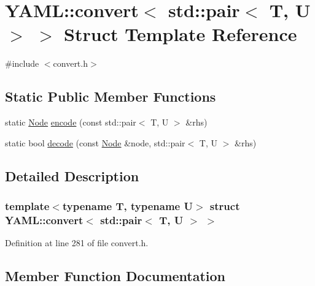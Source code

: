 \hypertarget{struct_y_a_m_l_1_1convert_3_01std_1_1pair_3_01_t_00_01_u_01_4_01_4}{}\section{Y\+A\+ML\+::convert$<$ std\+::pair$<$ T, U $>$ $>$ Struct Template Reference}
\label{struct_y_a_m_l_1_1convert_3_01std_1_1pair_3_01_t_00_01_u_01_4_01_4}


{\ttfamily \#include $<$convert.\+h$>$}

\subsection*{Static Public Member Functions}
\begin{DoxyCompactItemize}
\item 
static \mbox{\hyperlink{class_y_a_m_l_1_1_node}{Node}} \mbox{\hyperlink{struct_y_a_m_l_1_1convert_3_01std_1_1pair_3_01_t_00_01_u_01_4_01_4_a9a8ca594f6cdb930d0d029377cf5d3d4}{encode}} (const std\+::pair$<$ T, U $>$ \&rhs)
\item 
static bool \mbox{\hyperlink{struct_y_a_m_l_1_1convert_3_01std_1_1pair_3_01_t_00_01_u_01_4_01_4_ad6fdf202b1a7ac69b29f8279bc10b946}{decode}} (const \mbox{\hyperlink{class_y_a_m_l_1_1_node}{Node}} \&node, std\+::pair$<$ T, U $>$ \&rhs)
\end{DoxyCompactItemize}


\subsection{Detailed Description}
\subsubsection*{template$<$typename T, typename U$>$\newline
struct Y\+A\+M\+L\+::convert$<$ std\+::pair$<$ T, U $>$ $>$}



Definition at line 281 of file convert.\+h.



\subsection{Member Function Documentation}
\mbox{\label{struct_y_a_m_l_1_1convert_3_01std_1_1pair_3_01_t_00_01_u_01_4_01_4_ad6fdf202b1a7ac69b29f8279bc10b946}} 
